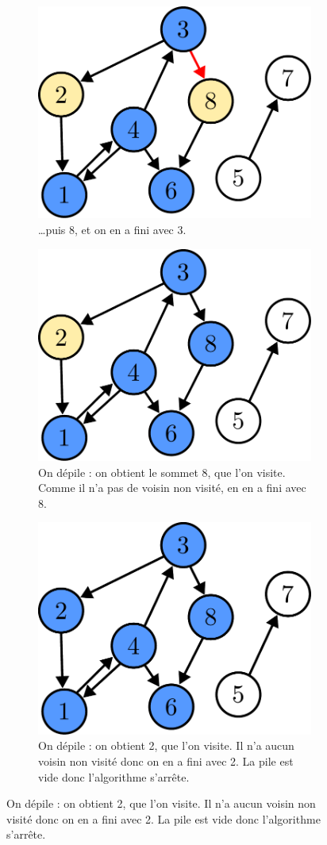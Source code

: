 \documentclass{article}
\begin{document}
\begin{itemize}
\begin{figure}[b]
\begin{subfigure}[t]{0.3\linewidth}
			\includegraphics[width=0.9\linewidth]{../figures/dfs4.pdf}
			\caption{\ldots puis 8, et on en a fini avec 3.}
		\end{subfigure}
		
		\begin{subfigure}[t]{0.45\linewidth}
			\centering
			\includegraphics[width=0.6\linewidth]{../figures/dfs5.pdf}
			\caption{On dépile : on obtient le sommet 8, que l'on visite. Comme il n'a pas de voisin non visité, en en a fini avec 8.}
		\end{subfigure}\hfill%
		\begin{subfigure}[t]{0.45\linewidth}
			\centering
			\includegraphics[width=0.6\linewidth]{../figures/bfs11.pdf}
			\caption{On dépile : on obtient 2, que l'on visite. Il n'a aucun voisin non visité donc on en a fini avec 2. La pile est vide donc l'algorithme s'arrête.}
		\end{subfigure}
	\end{figure}


\end{itemize}
\end{document}
